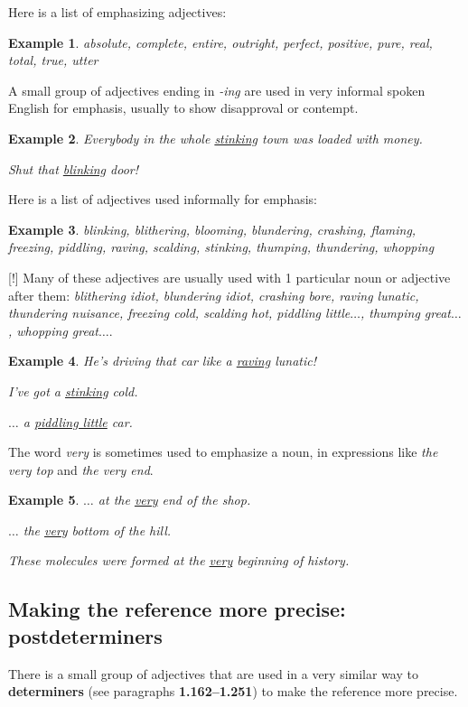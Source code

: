 \documentclass[oneside]{book}
\numberwithin{equation}{section}
\newtheorem{example}{Example}[section]
\begin{document}
%
Here is a list of emphasizing adjectives:
\begin{example}
    absolute, complete, entire, outright, perfect, positive, pure, real, total, true, utter
\end{example}
%
\noindent{} A small group of adjectives ending in \textit{-ing} are used in very informal spoken English for emphasis, usually to show disapproval or contempt.
\begin{example}
    Everybody in the whole \underline{stinking} town was loaded with money.
    
    Shut that \underline{blinking} door!
\end{example}
Here is a list of adjectives used informally for emphasis:
\begin{example}
    blinking, blithering, blooming, blundering, crashing, flaming, freezing, piddling, raving, scalding, stinking, thumping, thundering, whopping
\end{example}
%
\noindent{} [!] Many of these adjectives are usually used with 1 particular noun or adjective after them: \textit{blithering idiot, blundering idiot, crashing bore, raving lunatic, thundering nuisance, freezing cold, scalding hot, piddling little$\ldots$, thumping great$\ldots$, whopping great$\ldots$}.
\begin{example}
    He's driving that car like a \underline{raving} lunatic!
    
    I've got a \underline{stinking} cold.
    
    $\ldots$ a \underline{piddling little} car.
\end{example}
%
\noindent{} The word \textit{very} is sometimes used to emphasize a noun, in expressions like \textit{the very top} and \textit{the very end}.
\begin{example}
    $\ldots$ at the \underline{very} end of the shop.
    
    $\ldots$ the \underline{very} bottom of the hill.
    
    These molecules were formed at the \underline{very} beginning of history.
\end{example}

\subsection{Making the reference more precise: postdeterminers}
\noindent{} There is a small group of adjectives that are used in a very similar way to \textbf{determiners} (see paragraphs \textbf{1.162--1.251}) to make the reference more precise.
\end{document}
